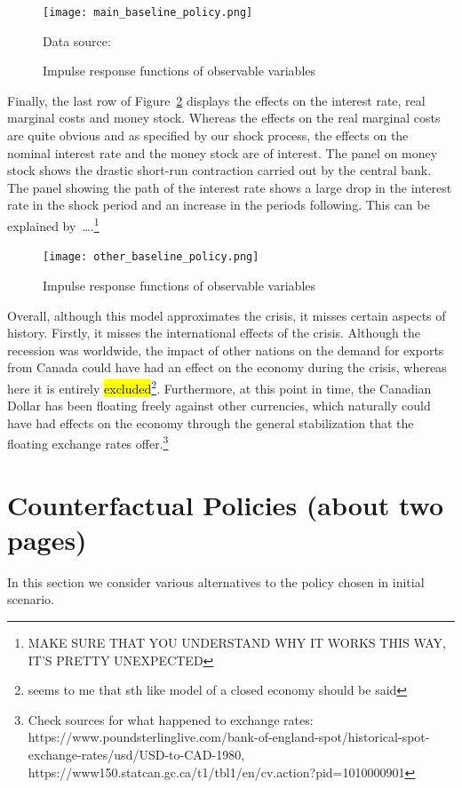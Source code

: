\documentclass[12pt]{article}
\begin{document}
\begin{figure}[!h]
    \caption{Impulse response functions of observable variables}\label{fig:main_baseline}
    \centering
    \texttt{[image: main\_baseline\_policy.png]}
    
    \tiny{Data source: \citeauthor{worldbank_inflation_ca}}
\end{figure}

Finally, the last row of Figure~\ref{fig:other_baseline} displays the effects on the interest rate, real marginal costs and money stock. Whereas the effects on the real marginal costs are quite obvious and as specified by our shock process, the effects on the nominal interest rate and the money stock are of interest. The panel on money stock shows the drastic short-run contraction carried out by the central bank. The panel showing the path of the interest rate shows a large drop in the interest rate in the shock period and an increase in the periods following. This can be explained by\ \dots.\footnote{MAKE SURE THAT YOU UNDERSTAND WHY IT WORKS THIS WAY, IT'S PRETTY UNEXPECTED}   

\begin{figure}[!h]
    \caption{Impulse response functions of observable variables}\label{fig:other_baseline}
    \centering
    \texttt{[image: other\_baseline\_policy.png]}
\end{figure}

Overall, although this model approximates the crisis, it misses certain aspects of history. Firstly, it misses the international effects of the crisis. Although the recession was worldwide, the impact of other nations on the demand for exports from Canada could have had an effect on the economy during the crisis, whereas here it is entirely \hl{excluded}\footnote{seems to me that sth like model of a closed economy should be said}. Furthermore, at this point in time, the Canadian Dollar has been floating freely against other currencies, which naturally could have had effects on the economy through the general stabilization that the floating exchange rates offer.\footnote{Check sources for what happened to exchange rates: https://www.poundsterlinglive.com/bank-of-england-spot/historical-spot-exchange-rates/usd/USD-to-CAD-1980, \\

https://www150.statcan.gc.ca/t1/tbl1/en/cv.action?pid=1010000901}

\newpage
\section{Counterfactual Policies (about two pages)}
In this section we consider various alternatives to the policy chosen in initial scenario.
\end{document}

